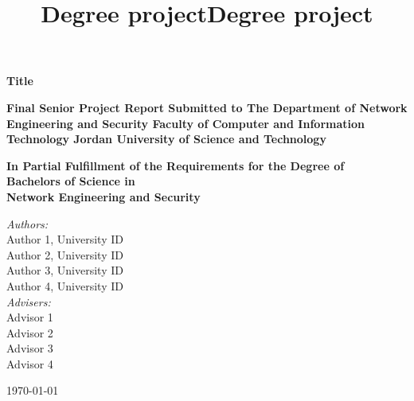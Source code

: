 \documentclass[10pt]{report}
\title{Degree project}
\title{Degree project}
\begin{document}

\thispagestyle{firststyle}
\begin{center}
  { \huge \bfseries Title}\\[0.4cm]	

  \vspace*{1.5cm}

  \textbf{\LARGE Final Senior Project Report Submitted to \vspace{10pt}
        The Department of Network Engineering and Security\vspace{10pt}
        Faculty of Computer and Information Technology\vspace{10pt}
        Jordan University of Science and Technology}\vspace{20pt}
        
   \vspace{1cm}
   
   \textbf{\LARGE In Partial Fulfillment of the Requirements for the Degree of\\ \vspace{10pt}
   Bachelors of Science in\\ \vspace{10pt} 
   Network Engineering and Security}

  
  \vspace*{1cm}

  
  \vspace*{1cm}
  { \large 
    \emph{Authors:} \\	
      Author 1, University ID \\
      Author 2, University ID \\
      Author 3, University ID \\
      Author 4, University ID \\
    \vspace*{0.5cm}
    \emph{Advisers:} \\													  
      Advisor 1 \\
      Advisor 2	\\
      Advisor 3	\\
      Advisor 4	\\
  }


  \vspace{2cm} 	
  \begin{center}
    {\today}
  \end{center}
  
\end{center}
																		
\end{document}
